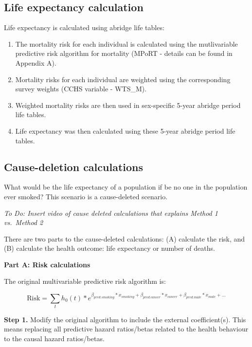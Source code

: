 \documentclass[]{book}
\providecommand{\tightlist}{%
  \setlength{\itemsep}{0pt}\setlength{\parskip}{0pt}}
\begin{document}
\subsection{Life expectancy
calculation}\label{life-expectancy-calculation}

Life expectancy is calculated using abridge life tables:

\begin{enumerate}
\def\labelenumi{\arabic{enumi}.}
\tightlist
\item
  The mortality risk for each individual is calculated using the
  mutlivariable predictive risk algorithm for mortality (MPoRT - details
  can be found in Appendix A).
\item
  Mortality risks for each individual are weighted using the
  corresponding survey weights (CCHS variable - WTS\_M).
\item
  Weighted mortality risks are then used in sex-specific 5-year abridge
  period life tables.
\item
  Life expectancy was then calculated using these 5-year abridge period
  life tables.
\end{enumerate}

\subsection{Cause-deletion
calculations}\label{cause-deletion-calculations}

What would be the life expectancy of a population if be no one in the
population ever smoked? This scenario is a cause-deleted scenario.

\emph{To Do: Insert video of cause deleted calculations that explains
Method 1 vs.~Method 2}

There are two parts to the cause-deleted calculations: (A) calculate the
risk, and (B) calculate the health outcome: life expectancy or number of
deaths.

\textbf{Part A: Risk calculations}

The original multivariable predictive risk algorithm is:

\[ \text{Risk} = \sum_t h_0(t) * e^{\beta_{pred.smoking}*x_{smoking}+\beta_{pred.cancer}*x_{cancer} + \beta_{pred.male}*x_{male} +...}  \]

\textbf{Step 1.} Modify the original algorithm to include the external
coefficient(s). This means replacing all predictive hazard ratios/betas
related to the health behaviour to the causal hazard ratios/betas.
\end{document}
